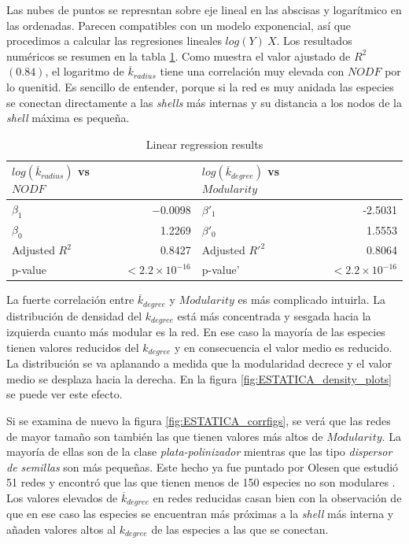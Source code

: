 Las nubes de puntos se represntan sobre eje lineal en las abscisas y logarítmico en las ordenadas. Parecen compatibles con un modelo exponencial, así que procedimos a calcular las regresiones lineales $log(Y) ~ X$. Los resultados numéricos se resumen en la tabla \ref{table:table_lmodel}. Como muestra el valor ajustado de $R^2$ $(0.84)$, el logaritmo de $\overline {k}_{radius}$ tiene una correlación muy elevada con $NODF$ por lo quenitid. Es sencillo de entender, porque si la red es muy anidada las especies se conectan directamente a las \textit{shells} más internas y su distancia a los nodos de la \textit{shell} máxima es pequeña. 

\begin{table}[ht]
\centering
\begin{tabular}{|l r | l r|}
\hline
$log(\overline {k}_{radius})$ vs $NODF$& & $log(\overline {k}_{degree})$ vs $Modularity$ & \\
\hline
$\beta_1$ & $-$0.0098 & $\beta'_1$ & -2.5031 \\
$\beta_0$ & 1.2269 & $\beta'_0$ & 1.5553 \\
Adjusted $R^2$ &  0.8427  & Adjusted $R'^2$& 0.8064\\
p-value & $<2.2 \times 10^{-16}$& p-value' & $<2.2 \times 10^{-16}$\\
\hline
\end{tabular}
\caption{\label{table:table_lmodel} Linear regression results}
\end{table}

La fuerte correlación entre $\overline {k}_{degree}$ y $Modularity$ es más complicado intuirla. La distribución de densidad del $k_{degree}$ está más concentrada y sesgada hacia la izquierda cuanto más modular es la red. En ese caso la mayoría de las especies tienen valores reducidos del ${k}_{degree}$ y en consecuencia el valor medio es reducido. La distribución se va aplanando a medida que la modularidad decrece y el valor medio se desplaza hacia la derecha. En la figura \ref{fig:ESTATICA_density_plots} se puede ver este efecto.

Si se examina de nuevo la figura \ref{fig:ESTATICA_corrfigs}, se verá que las redes de mayor tamaño son también las que tienen valores más altos de $Modularity$. La mayoría de ellas son de la clase \textit{plata-polinizador} mientras que las tipo \textit{dispersor de semillas} son más pequeñas. Este hecho ya fue puntado por Olesen que estudió 51 redes y encontró que las que tienen menos de 150 especies no son modulares \cite{olesen2007modularity}. Los valores elevados de $\overline {k}_{degree}$ en redes reducidas casan bien con la observación de que en ese caso las especies se encuentran más próximas a la \textit{shell} más interna y añaden valores altos al ${k}_{degree}$ de las especies a las que se conectan.

